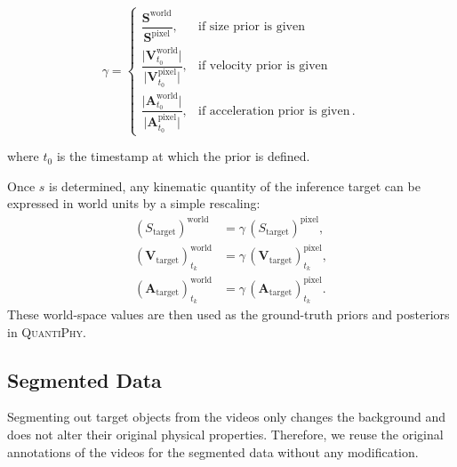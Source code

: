\begin{equation*}
\gamma =
\begin{cases}
\dfrac{\mathbf S^{\mathrm{world}}}{\mathbf S^{\mathrm{pixel}}}, 
  & \text{if size prior is given} \\[0.6em]
\dfrac{\lvert \mathbf V^{\mathrm{world}}_{t_0} \rvert}{\lvert \mathbf V^{\mathrm{pixel}}_{t_0} \rvert},
  & \text{if velocity prior is given} \\[0.6em]
\dfrac{\lvert \mathbf A^{\mathrm{world}}_{t_0} \rvert}{\lvert \mathbf A^{\mathrm{pixel}}_{t_0} \rvert},
  & \text{if acceleration prior is given} \, .
\end{cases}
\label{eq:scale_factor}
\end{equation*}

where $t_0$ is the timestamp at which the prior is defined.

Once $s$ is determined, any kinematic quantity of the inference target can be expressed in world units by a simple rescaling:
\begin{align*}
(S_{\text{target}})^{\mathrm{world}} &= \gamma \, (S_{\text{target}})^{\mathrm{pixel}},\\
(\mathbf V_{\text{target}})^{\mathrm{world}}_{t_k} &= \gamma \, (\mathbf V_{\text{target}})^{\mathrm{pixel}}_{t_k},\\
(\mathbf A_{\text{target}})^{\mathrm{world}}_{t_k} &= \gamma \, (\mathbf A_{\text{target}})^{\mathrm{pixel}}_{t_k}.
\end{align*}
These world-space values are then used as the ground-truth priors and posteriors in \textsc{QuantiPhy}.




\subsection{Segmented Data}
Segmenting out target objects from the videos only changes the background and does not alter their original physical properties. Therefore, we reuse the original annotations of the videos for the segmented data without any modification.
